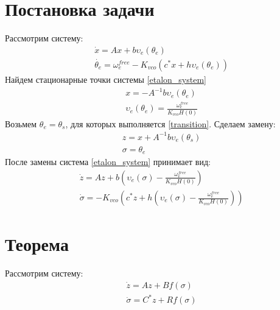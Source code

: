 \documentclass[a4paper,14pt]{extarticle} %
\begin{document}
\section{Постановка задачи}
Рассмотрим систему:
 \begin{equation}\label{etalon_system}
 \begin{aligned}
 &\dot{x} = Ax + b\upsilon_e(\theta_e)\\
 &\dot{\theta_e} = \omega_e^{free} - K_{vco}(c^*x + h\upsilon_e(\theta_e))
 \end{aligned}
\end{equation}
Найдем стационарные точки системы \eqref{etalon_system}
 \begin{equation}\label{transition}
 \begin{aligned}
 &x = -A^{-1}b\upsilon_e(\theta_e)\\
 &\upsilon_e(\theta_e) = \frac{\omega_e^{free}}{K_{vco}H(0)}
 \end{aligned}
\end{equation}
Возьмем $\theta_e = \theta_s$, для которых выполняется \eqref{transition}. Сделаем замену:
 \begin{equation}\label{replacement1}
 \begin{aligned}
 &z =x + A^{-1}b\upsilon_e(\theta_s)\\
 &\sigma = \theta_e 
 \end{aligned}
\end{equation}
После замены система \eqref{etalon_system} принимает вид:
 \begin{equation}
 \begin{aligned}
 &\dot{z} = Az + b(\upsilon_e(\sigma) - \frac{\omega_e^{free}}{K_{vco}H(0)})\\
 &\dot{\sigma} = -K_{vco}(c^*z + h(\upsilon_e(\sigma) - \frac{\omega_e^{free}}{K_{vco}H(0)}))
 \end{aligned}
\end{equation}

\newpage
\section{Теорема}
Рассмотрим систему:
 \begin{equation}\label{system}
 \begin{aligned}
 &\dot{z} = Az + Bf(\sigma)\\
 &\dot{\sigma} = C^*z + Rf(\sigma)
 \end{aligned}
\end{equation}
\end{document}
